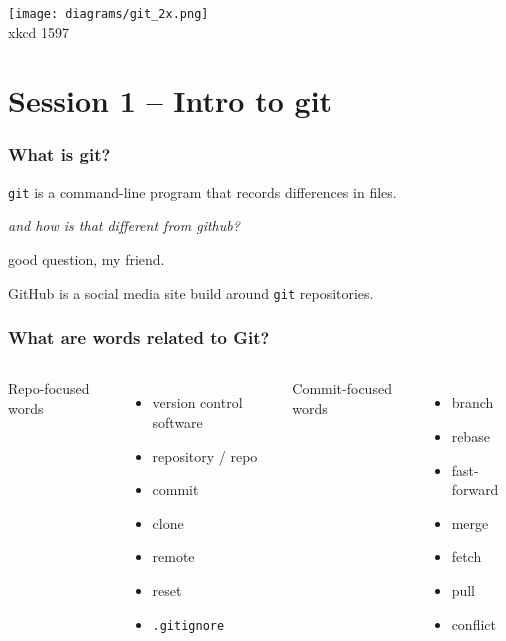 \documentclass[14pt,aspectratio=1610]{beamer} %
\newcommand{\fframe}[2]{
   \begin{frame}
\frametitle{#1}
#2
\end{frame}
}
\begin{document}
\fframe{}
{
	\begin{center}
\texttt{[image: diagrams/git\_2x.png]}\\xkcd 1597
	\end{center}
}

\section{Session 1 -- Intro to git}



\fframe{What is git?}
{
\begin{definition}
	{\tt git} is a command-line program that records differences in files.
\end{definition}
\vspace{\baselineskip}

	{\em and how is that different from github?}

\vspace{\baselineskip}
	good question, my friend.  
	\begin{definition}
	GitHub is a social media site build around {\tt git} repositories.  
	\end{definition}
}


\fframe{What are words related to Git?}
{
	\begin{columns}[t]
	\column{2in}
	Repo-focused words
	\begin{itemize}
		\item version control software
		\item repository / repo
		\item commit
		\item clone
		\item remote
		\item reset
		\item {\tt .gitignore}


		
	\end{itemize}

	\column{2in}
	Commit-focused words
	\begin{itemize}		
		\item branch
		\item rebase
		\item fast-forward
		\item merge
		\item fetch
		\item pull
		\item conflict
	\end{itemize}
	\end{columns}
}
\end{document}
